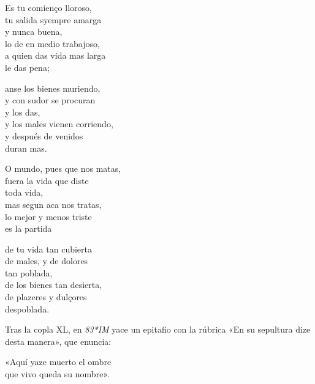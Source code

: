 \documentclass[11pt,a4paper,twoside]{article}
\newcommand{\comillas}[1]{«#1»}
\begin{document}
\begin{pairs}
	\begin{Leftside}
		\beginnumbering
		\pstart
		Es tu comienço lloroso,\\
		tu salida syempre amarga\\
		y nunca buena,\\
		lo de en medio trabajoso,\\
		a quien das vida mas larga\\
		le das pena;\par
		anse los bienes muriendo,\\
		y con sudor se procuran\\
		y los das,\\
		y los males vienen corriendo,\\
		y después de venidos\\
		duran mas.\par
		\pend
		\endnumbering
	\end{Leftside}
	\begin{Rightside}
		\beginnumbering
		\pstart
		O mundo, pues que nos matas,\\
		fuera la vida que diste\\
		toda vida,\\
		mas segun aca nos tratas,\\
		lo mejor y menos triste\\
		es la partida\par
		de tu vida tan cubierta\\
		de males, y de dolores\\
		tan poblada,\\
		de los bienes tan desierta,\\
		de plazeres y dulçores\\
		despoblada.\par
		\pend
		\endnumbering
	\end{Rightside}
\end{pairs}
	\Columns

\vspace{11pt} Tras la copla XL, en \textit{83*IM} yace un epitafio con la rúbrica \comillas{En su sepultura dize desta manera}, que enuncia:\vspace{5pt}

\comillas{Aquí yaze muerto el ombre\\
	que vivo queda su nombre}.
\relax
\vfill
%
\end{document}
